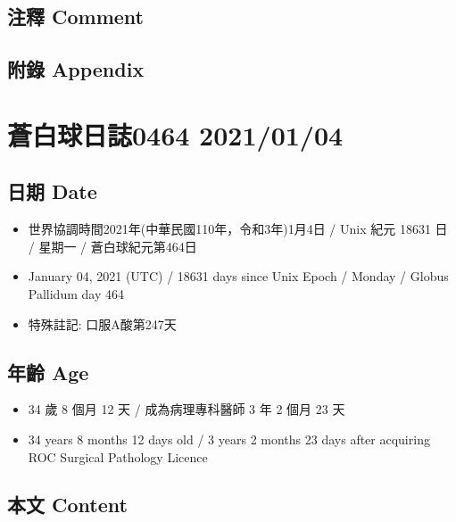 \documentclass[a5paper, 11pt
]{book}
\providecommand{\tightlist}{%
  \setlength{\itemsep}{0pt}\setlength{\parskip}{0pt}}
\begin{document}
\hypertarget{ux6ce8ux91cb-comment-33}{%
\subsection{注釋 Comment}\label{ux6ce8ux91cb-comment-33}}

\hypertarget{ux9644ux9304-appendix-33}{%
\subsection{附錄 Appendix}\label{ux9644ux9304-appendix-33}}

\hypertarget{ux84bcux767dux7403ux65e5ux8a8c0464-20210104}{%
\section{蒼白球日誌0464
2021/01/04}\label{ux84bcux767dux7403ux65e5ux8a8c0464-20210104}}

\hypertarget{ux65e5ux671f-date-34}{%
\subsection{日期 Date}\label{ux65e5ux671f-date-34}}

\begin{itemize}
\tightlist
\item
  世界協調時間2021年(中華民國110年，令和3年)1月4日 / Unix 紀元 18631 日
  / 星期一 / 蒼白球紀元第464日
\item
  January 04, 2021 (UTC) / 18631 days since Unix Epoch / Monday / Globus
  Pallidum day 464
\item
  特殊註記: 口服A酸第247天
\end{itemize}

\hypertarget{ux5e74ux9f61-age-34}{%
\subsection{年齡 Age}\label{ux5e74ux9f61-age-34}}

\begin{itemize}
\tightlist
\item
  34 歲 8 個月 12 天 / 成為病理專科醫師 3 年 2 個月 23 天
\item
  34 years 8 months 12 days old / 3 years 2 months 23 days after
  acquiring ROC Surgical Pathology Licence
\end{itemize}

\hypertarget{ux672cux6587-content-34}{%
\subsection{本文 Content}\label{ux672cux6587-content-34}}
\end{document}
